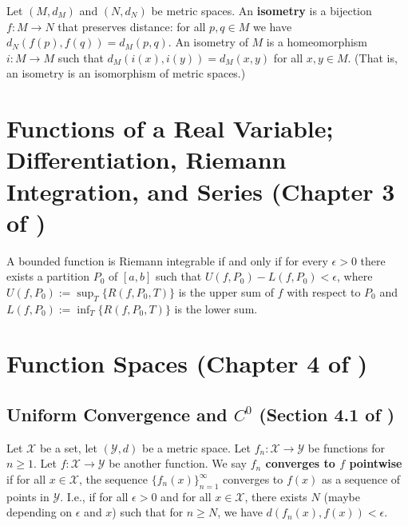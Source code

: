 \begin{definition}

Let \((M, d_M)\) and \((N, d_N)\) be metric spaces. An \textbf{isometry} is a bijection \(f: M \to N \) that preserves distance: for all \(p, q \in M\) we have \(d_N(f(p), f(q)) = d_M(p, q)\). An isometry of \(M\) is a homeomorphism \(i: M \to M\) such that \(d_M(i(x), i(y)) = d_M(x,y)\) for all \(x, y \in M\). (That is, an isometry is an isomorphism of metric spaces.)
 
\end{definition}

\section{Functions of a Real Variable; Differentiation, Riemann Integration, and Series (Chapter 3 of \citet{pugh2015real})}

\begin{theorem}\label{ra.thm.3.21.pugh}

A bounded function is Riemann integrable if and only if for every \(\epsilon > 0\) there exists a partition \(P_0\) of \([a,b]\) such that \(U(f,P_0) - L(f,P_0) < \epsilon\), where \(U(f, P_0) := \sup_T \{ R(f, P_0, T) \}\) is the upper sum of \(f\) with respect to \(P_0\) and \(L(f,P_0) :=  \inf_T  \{R(f, P_0, T) \}\) is the lower sum.

\end{theorem}

\section{Function Spaces (Chapter 4 of \citet{pugh2015real})}

\subsection{Uniform Convergence and \(C^0\) (Section 4.1 of \citet{pugh2015real})}

\begin{definition}

Let \(\mathcal{X}\) be a set, let \((\mathcal{Y}, d)\) be a metric space. Let \(f_n : \mathcal{X} \to \mathcal{Y}\) be functions for \(n \geq 1\). Let \(f: \mathcal{X} \to \mathcal{Y}\) be another function. We say \textbf{\(f_n\) converges to \(f\) pointwise} if for all \(x \in \mathcal{X}\), the sequence \(\{ f_n(x)\}_{n=1}^\infty\) converges to \(f(x)\) as a sequence of points in \(\mathcal{Y}\). I.e., if for all \(\epsilon > 0\) and for all \(x \in \mathcal{X}\), there exists \(N\) (maybe depending on \(\epsilon\) and \(x\)) such that for \( n \geq N\), we have \(d(f_n(x), f(x)) < \epsilon\). 

\end{definition}

